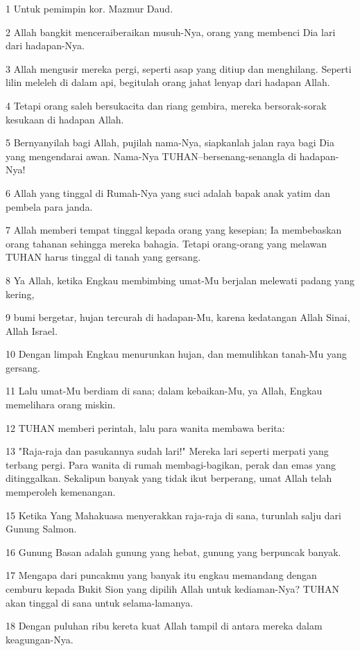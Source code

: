 \par 1 Untuk pemimpin kor. Mazmur Daud.
\par 2 Allah bangkit menceraiberaikan musuh-Nya, orang yang membenci Dia lari dari hadapan-Nya.
\par 3 Allah mengusir mereka pergi, seperti asap yang ditiup dan menghilang. Seperti lilin meleleh di dalam api, begitulah orang jahat lenyap dari hadapan Allah.
\par 4 Tetapi orang saleh bersukacita dan riang gembira, mereka bersorak-sorak kesukaan di hadapan Allah.
\par 5 Bernyanyilah bagi Allah, pujilah nama-Nya, siapkanlah jalan raya bagi Dia yang mengendarai awan. Nama-Nya TUHAN--bersenang-senangla di hadapan-Nya!
\par 6 Allah yang tinggal di Rumah-Nya yang suci adalah bapak anak yatim dan pembela para janda.
\par 7 Allah memberi tempat tinggal kepada orang yang kesepian; Ia membebaskan orang tahanan sehingga mereka bahagia. Tetapi orang-orang yang melawan TUHAN harus tinggal di tanah yang gersang.
\par 8 Ya Allah, ketika Engkau membimbing umat-Mu berjalan melewati padang yang kering,
\par 9 bumi bergetar, hujan tercurah di hadapan-Mu, karena kedatangan Allah Sinai, Allah Israel.
\par 10 Dengan limpah Engkau menurunkan hujan, dan memulihkan tanah-Mu yang gersang.
\par 11 Lalu umat-Mu berdiam di sana; dalam kebaikan-Mu, ya Allah, Engkau memelihara orang miskin.
\par 12 TUHAN memberi perintah, lalu para wanita membawa berita:
\par 13 "Raja-raja dan pasukannya sudah lari!" Mereka lari seperti merpati yang terbang pergi. Para wanita di rumah membagi-bagikan, perak dan emas yang ditinggalkan. Sekalipun banyak yang tidak ikut berperang, umat Allah telah memperoleh kemenangan.
\par 15 Ketika Yang Mahakuasa menyerakkan raja-raja di sana, turunlah salju dari Gunung Salmon.
\par 16 Gunung Basan adalah gunung yang hebat, gunung yang berpuncak banyak.
\par 17 Mengapa dari puncakmu yang banyak itu engkau memandang dengan cemburu kepada Bukit Sion yang dipilih Allah untuk kediaman-Nya? TUHAN akan tinggal di sana untuk selama-lamanya.
\par 18 Dengan puluhan ribu kereta kuat Allah tampil di antara mereka dalam keagungan-Nya.
